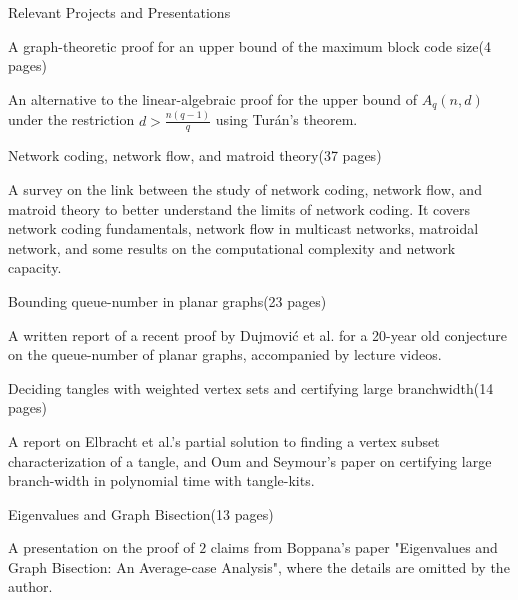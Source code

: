 \documentclass{cv}
\begin{document}
\begin{rSection}{Relevant Projects and Presentations}
\begin{rSubsection}{A graph-theoretic proof for an upper bound of the maximum block code size}{(4 pages)}{}{}
	\item An alternative to the linear-algebraic proof for the upper bound of $A_q(n,d)$ under the restriction $d > \frac{n(q-1)}{q}$ using Tur\'{a}n's theorem.
\end{rSubsection}
	
\begin{rSubsection}{Network coding, network flow, and matroid theory}{(37 pages)}{}{}
	\item A survey on the link between the study of network coding, network flow, and matroid theory 
	to better understand the limits of network coding. It covers network coding fundamentals, network flow in 
	multicast networks, matroidal network, and some results on the computational complexity and network capacity.
\end{rSubsection}

\begin{rSubsection}{Bounding queue-number in planar graphs}{(23 pages)}{}{}
	\item A written report of a recent proof by Dujmovi\'{c} et al. for a 20-year old conjecture on the queue-number of planar graphs, 
	accompanied by lecture videos.
\end{rSubsection}

\begin{rSubsection}{Deciding tangles with weighted vertex sets and certifying large branchwidth}{(14 pages)}{}{}
	\item A report on Elbracht et al.'s partial solution to finding a vertex subset characterization of a tangle, and Oum and 
	Seymour's paper on certifying large branch-width in polynomial time with tangle-kits.
\end{rSubsection}

\begin{rSubsection}{Eigenvalues and Graph Bisection}{(13 pages)}{}{}
	\item A presentation on the proof of $2$ claims from Boppana's paper "Eigenvalues and Graph Bisection: An Average-case Analysis", 
	where the details are omitted by the author.
\end{rSubsection}
\end{rSection}
\end{document}
